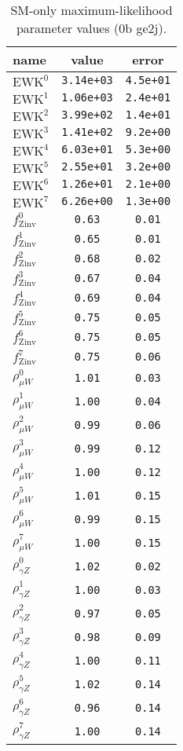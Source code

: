 %

\begin{table}\centering
\caption{SM-only maximum-likelihood parameter values (0b ge2j).}
\label{tab:mlParameterValues0b_ge2j}
\begin{tabular}{lcc}name & value & error \\ \hline
$\mathrm{EWK}^{0}$ & {\tt  3.14e+03} & {\tt  4.5e+01}\\
$\mathrm{EWK}^{1}$ & {\tt  1.06e+03} & {\tt  2.4e+01}\\
$\mathrm{EWK}^{2}$ & {\tt  3.99e+02} & {\tt  1.4e+01}\\
$\mathrm{EWK}^{3}$ & {\tt  1.41e+02} & {\tt  9.2e+00}\\
$\mathrm{EWK}^{4}$ & {\tt  6.03e+01} & {\tt  5.3e+00}\\
$\mathrm{EWK}^{5}$ & {\tt  2.55e+01} & {\tt  3.2e+00}\\
$\mathrm{EWK}^{6}$ & {\tt  1.26e+01} & {\tt  2.1e+00}\\
$\mathrm{EWK}^{7}$ & {\tt  6.26e+00} & {\tt  1.3e+00}\\
$f_\mathrm{Zinv}^{0}$ & {\tt 0.63} & {\tt 0.01}\\
$f_\mathrm{Zinv}^{1}$ & {\tt 0.65} & {\tt 0.01}\\
$f_\mathrm{Zinv}^{2}$ & {\tt 0.68} & {\tt 0.02}\\
$f_\mathrm{Zinv}^{3}$ & {\tt 0.67} & {\tt 0.04}\\
$f_\mathrm{Zinv}^{4}$ & {\tt 0.69} & {\tt 0.04}\\
$f_\mathrm{Zinv}^{5}$ & {\tt 0.75} & {\tt 0.05}\\
$f_\mathrm{Zinv}^{6}$ & {\tt 0.75} & {\tt 0.05}\\
$f_\mathrm{Zinv}^{7}$ & {\tt 0.75} & {\tt 0.06}\\
$\rho_{\mu W}^{0}$ & {\tt 1.01} & {\tt 0.03}\\
$\rho_{\mu W}^{1}$ & {\tt 1.00} & {\tt 0.04}\\
$\rho_{\mu W}^{2}$ & {\tt 0.99} & {\tt 0.06}\\
$\rho_{\mu W}^{3}$ & {\tt 0.99} & {\tt 0.12}\\
$\rho_{\mu W}^{4}$ & {\tt 1.00} & {\tt 0.12}\\
$\rho_{\mu W}^{5}$ & {\tt 1.01} & {\tt 0.15}\\
$\rho_{\mu W}^{6}$ & {\tt 0.99} & {\tt 0.15}\\
$\rho_{\mu W}^{7}$ & {\tt 1.00} & {\tt 0.15}\\
$\rho_{\gamma Z}^{0}$ & {\tt 1.02} & {\tt 0.02}\\
$\rho_{\gamma Z}^{1}$ & {\tt 1.00} & {\tt 0.03}\\
$\rho_{\gamma Z}^{2}$ & {\tt 0.97} & {\tt 0.05}\\
$\rho_{\gamma Z}^{3}$ & {\tt 0.98} & {\tt 0.09}\\
$\rho_{\gamma Z}^{4}$ & {\tt 1.00} & {\tt 0.11}\\
$\rho_{\gamma Z}^{5}$ & {\tt 1.02} & {\tt 0.14}\\
$\rho_{\gamma Z}^{6}$ & {\tt 0.96} & {\tt 0.14}\\
$\rho_{\gamma Z}^{7}$ & {\tt 1.00} & {\tt 0.14}\\
\hline
\end{tabular}
\end{table}
%